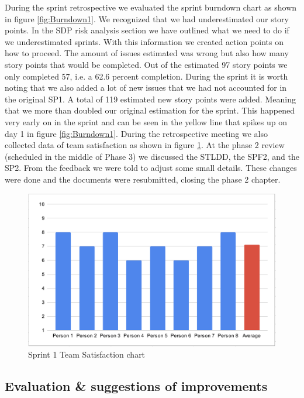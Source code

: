 \documentclass{article}
\begin{document}
During the sprint retrospective we evaluated the sprint burndown chart as shown in figure \ref{fig:Burndown1}. We recognized that we had underestimated our story points. In the SDP risk analysis section we have outlined what we need to do if we underestimated sprints. With this information we created action points on how to proceed. The amount of issues estimated was wrong but also how many story points that would be completed. Out of the estimated 97 story points we only completed 57, i.e. a 62.6 percent completion. During the sprint it is worth noting that we also added a lot of new issues that we had not accounted for in the original SP1. A total of 119 estimated new story points were added. Meaning that we more than doubled our original estimation for the sprint. This happened very early on in the sprint and can be seen in the yellow line that spikes up on day 1 in figure \ref{fig:Burndown1}. During the retrospective meeting we also collected data of team satisfaction as shown in figure \ref{fig:Satisfaction1}. At the phase 2 review (scheduled in the middle of Phase 3) we discussed the STLDD, the SPF2, and the SP2. From the feedback we were told to adjust some small details. These changes were done and the documents were resubmitted, closing the phase 2 chapter.  

\begin{figure}[h!]
    \centering
    \includegraphics[scale=0.6]{pfrFigures/TeamSatisfaction1.png}
    \caption{Sprint 1 Team Satisfaction chart}
    \label{fig:Satisfaction1}
\end{figure}

\subsection{Evaluation \& suggestions of improvements}
\end{document}
